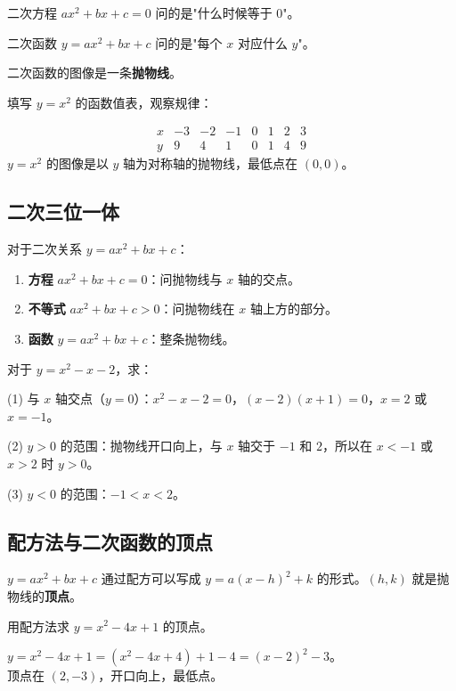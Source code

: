 二次方程 $ax^2+bx+c=0$ 问的是"什么时候等于 0"。

二次函数 $y = ax^2 + bx + c$ 问的是"每个 $x$ 对应什么 $y$"。

二次函数的图像是一条\textbf{抛物线}。

\begin{example}
填写 $y=x^2$ 的函数值表，观察规律：
\end{example}
\begin{solution}
\[
\begin{array}{c|cccccc}
x & -3 & -2 & -1 & 0 & 1 & 2 & 3 \\ \hline
y & 9 & 4 & 1 & 0 & 1 & 4 & 9
\end{array}
\]
$y=x^2$ 的图像是以 $y$ 轴为对称轴的抛物线，最低点在 $(0,0)$。
\end{solution}

\subsection*{二次三位一体}

对于二次关系 $y = ax^2 + bx + c$：

\begin{enumerate}
  \item \textbf{方程} $ax^2+bx+c=0$：问抛物线与 $x$ 轴的交点。
  \item \textbf{不等式} $ax^2+bx+c>0$：问抛物线在 $x$ 轴上方的部分。
  \item \textbf{函数} $y=ax^2+bx+c$：整条抛物线。
\end{enumerate}

\begin{example}
对于 $y = x^2 - x - 2$，求：
\end{example}
\begin{solution}
(1) 与 $x$ 轴交点（$y=0$）：$x^2-x-2=0$，$(x-2)(x+1)=0$，$x=2$ 或 $x=-1$。

(2) $y>0$ 的范围：抛物线开口向上，与 $x$ 轴交于 $-1$ 和 $2$，所以在 $x<-1$ 或 $x>2$ 时 $y>0$。

(3) $y<0$ 的范围：$-1<x<2$。
\end{solution}

\subsection*{配方法与二次函数的顶点}

$y = ax^2 + bx + c$ 通过配方可以写成 $y = a(x-h)^2 + k$ 的形式。$(h,k)$ 就是抛物线的\textbf{顶点}。

\begin{example}
用配方法求 $y = x^2 - 4x + 1$ 的顶点。
\end{example}
\begin{solution}
$y = x^2 - 4x + 1 = (x^2 - 4x + 4) + 1 - 4 = (x-2)^2 - 3$。\\
顶点在 $(2, -3)$，开口向上，最低点。
\end{solution}

